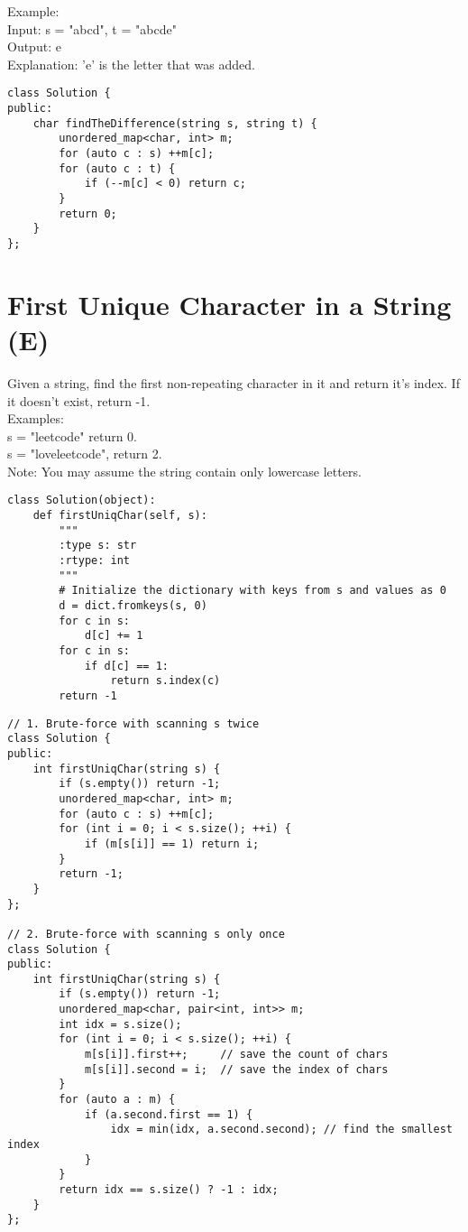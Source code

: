 Example:\\
Input: s = "abcd", t = "abcde"\\
Output: e\\
Explanation: 'e' is the letter that was added.\\

\begin{lstlisting}
class Solution {
public:
    char findTheDifference(string s, string t) {
        unordered_map<char, int> m;
        for (auto c : s) ++m[c];
        for (auto c : t) {
            if (--m[c] < 0) return c;
        }
        return 0;
    }
};
\end{lstlisting}


\section{First Unique Character in a String (E)}
Given a string, find the first non-repeating character in it and return it's index. If it doesn't exist, return -1.\\

Examples:\\
s = "leetcode"
return 0.\\
s = "loveleetcode",
return 2.\\

Note: You may assume the string contain only lowercase letters. \\

\begin{lstlisting}
class Solution(object):
    def firstUniqChar(self, s):
        """
        :type s: str
        :rtype: int
        """
        # Initialize the dictionary with keys from s and values as 0
        d = dict.fromkeys(s, 0)
        for c in s:
            d[c] += 1
        for c in s:
            if d[c] == 1:
                return s.index(c)
        return -1
\end{lstlisting}
        

\begin{lstlisting}
// 1. Brute-force with scanning s twice
class Solution {
public:
    int firstUniqChar(string s) {
        if (s.empty()) return -1;
        unordered_map<char, int> m;
        for (auto c : s) ++m[c];
        for (int i = 0; i < s.size(); ++i) {
            if (m[s[i]] == 1) return i;
        }
        return -1;
    }
};

// 2. Brute-force with scanning s only once
class Solution {
public:
    int firstUniqChar(string s) {
        if (s.empty()) return -1;
        unordered_map<char, pair<int, int>> m;
        int idx = s.size();
        for (int i = 0; i < s.size(); ++i) {
            m[s[i]].first++;     // save the count of chars
            m[s[i]].second = i;  // save the index of chars
        }
        for (auto a : m) {
            if (a.second.first == 1) {
                idx = min(idx, a.second.second); // find the smallest index
            }
        }
        return idx == s.size() ? -1 : idx;
    }
};
\end{lstlisting}

